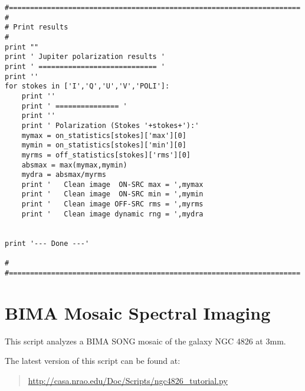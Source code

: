 \begin{verbatim}
#=====================================================================
#
# Print results
#
print ""
print ' Jupiter polarization results '
print ' ============================ '
print ''
for stokes in ['I','Q','U','V','POLI']:
    print ''
    print ' =============== '
    print ''
    print ' Polarization (Stokes '+stokes+'):'
    mymax = on_statistics[stokes]['max'][0]
    mymin = on_statistics[stokes]['min'][0]
    myrms = off_statistics[stokes]['rms'][0]
    absmax = max(mymax,mymin)
    mydra = absmax/myrms
    print '   Clean image  ON-SRC max = ',mymax
    print '   Clean image  ON-SRC min = ',mymin
    print '   Clean image OFF-SRC rms = ',myrms
    print '   Clean image dynamic rng = ',mydra


print '--- Done ---'

#
#=====================================================================
\end{verbatim}
\normalsize

\section{BIMA Mosaic Spectral Imaging}
\label{section:scripts.ngc4826}

This script analyzes a BIMA SONG mosaic of the galaxy NGC 4826
at 3mm.

The latest version of this script can be found at:
\begin{quote}
   \url{http://casa.nrao.edu/Doc/Scripts/ngc4826_tutorial.py}
\end{quote}

